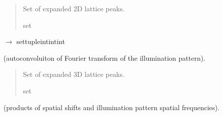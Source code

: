 \documentclass[letterpaper,10pt,english]{sphinxmanual}
\begin{document}
\begin{fulllineitems}
\begin{fulllineitems}
\begin{description}
\end{description}
\begin{quote}\begin{description}
\sphinxAtStartPar
Set of expanded 2D lattice peaks.

\sphinxAtStartPar
set

\end{description}\end{quote}

\end{fulllineitems}


\begin{fulllineitems}
\label{\detokenize{source/Illumination:Illumination.Illumination.compute_expanded_lattice3d}}
\pysigstartsignatures
\pysiglinewithargsret
{}
{}
{{ $\rightarrow$ set\DUrole{p}{{[}}tuple\DUrole{p}{{[}}intintint\DUrole{p}{{]}}\DUrole{p}{{]}}}}
\pysigstopsignatures\begin{description}
\sphinxAtStartPar
(autoconvoluiton of Fourier transform of the illumination pattern).

\end{description}
\begin{quote}\begin{description}
\sphinxAtStartPar
Set of expanded 3D lattice peaks.

\sphinxAtStartPar
set

\end{description}\end{quote}

\end{fulllineitems}


\begin{fulllineitems}
\label{\detokenize{source/Illumination:Illumination.Illumination.compute_phase_matrix}}
\pysigstartsignatures
\pysiglinewithargsret
{}
{}
{}
\pysigstopsignatures\begin{description}
\sphinxAtStartPar
(products of spatial shifts and illumination pattern spatial frequencies).


\end{description}
\end{fulllineitems}
\end{fulllineitems}
\end{document}
